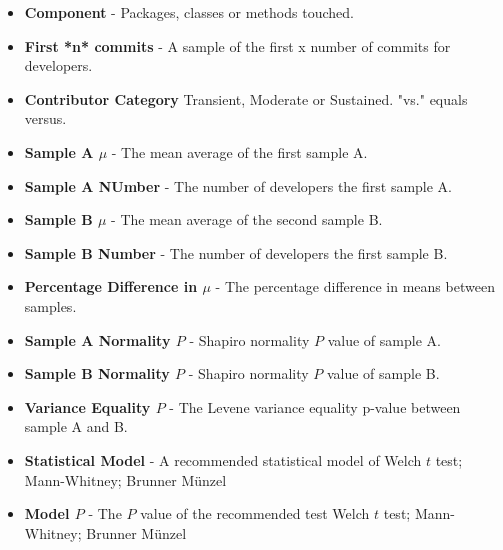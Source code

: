 \begin{itemize}
                    \item{\textbf{Component} - Packages, classes or methods touched.}
                    \item{\textbf{First *n* commits} - A sample of the first x number of commits for developers. }
                    \item{\textbf{Contributor Category} Transient, Moderate or Sustained. "vs." equals versus.}
                    \item{\textbf{Sample A $\mu$} - The mean average of the first sample A. }
                    \item{\textbf{Sample A NUmber} - The number of developers the first sample A.  }
                    \item{\textbf{Sample B $\mu$} - The mean average of the second sample B.}
                    \item{\textbf{Sample B Number} - The number of developers the first sample B.}
                    \item{\textbf{Percentage Difference in $\mu$} - The percentage difference in means between samples.}
                    \item{\textbf{Sample A Normality $P$} - Shapiro normality $P$ value of sample A. } 
                    \item{\textbf{Sample B Normality $P$} - Shapiro normality $P$ value of sample B. }
                    \item{\textbf{Variance Equality $P$} - The Levene variance equality p-value between sample A and B. }
                    \item{\textbf{Statistical Model} - A recommended statistical model of Welch $t$ test; Mann-Whitney; Brunner Münzel }
                    \item{\textbf{Model $P$} - The $P$ value of the recommended test Welch $t$ test; Mann-Whitney; Brunner Münzel }
                \end{itemize}
    


